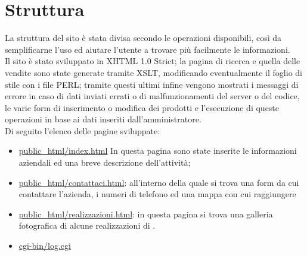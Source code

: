 \section{Struttura}{
	La struttura del sito è stata divisa secondo le operazioni disponibili, così da semplificarne l'uso ed aiutare l'utente a trovare più facilmente le informazioni.
	\\
	Il sito è stato sviluppato in XHTML 1.0 Strict; la pagina di ricerca e quella delle vendite sono state generate tramite XSLT, modificando eventualmente il foglio di stile con i file PERL; tramite questi ultimi infine vengono mostrati i messaggi di errore in caso di dati inviati errati o di malfunzionamenti del server o del codice, le varie form di inserimento o modifica dei prodotti e l'esecuzione di queste operazioni in base ai dati inseriti dall'amministratore.
	\\
	Di seguito l'elenco delle pagine sviluppate:
	\begin{itemize}
		\item \href{http://tecnologie-web.studenti.math.unipd.it/tecweb/~pgabelli/}{public_html/index.html} In questa pagina sono state inserite le informazioni aziendali ed una breve descrizione dell'attività;
		\item \href{http://tecnologie-web.studenti.math.unipd.it/tecweb/~pgabelli/}{public_html/contattaci.html}: all'interno della quale si trova una form da cui contattare l'azienda, i numeri di telefono ed una mappa con cui raggiungere \textbf{\ggt} 
		\item \href{http://tecnologie-web.studenti.math.unipd.it/tecweb/~pgabelli/}{public_html/realizzazioni.html}: in questa pagina si trova una galleria fotografica di alcune realizzazioni di \textbf{\ggt}.
		\item \href{http://tecnologie-web.studenti.math.unipd.it/tecweb/~pgabelli/}{cgi-bin/log.cgi} 
	\end{itemize}
}
